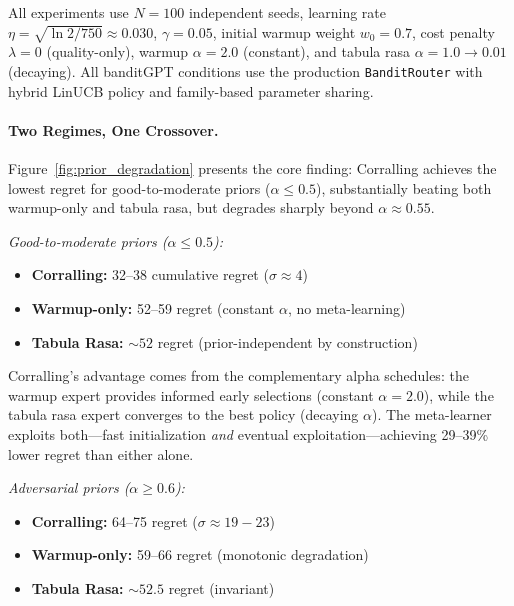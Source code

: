All experiments use $N{=}100$ independent seeds, learning rate
$\eta{=}\sqrt{\ln 2/750}{\approx}0.030$, $\gamma{=}0.05$, initial
warmup weight $w_0{=}0.7$, cost penalty $\lambda{=}0$ (quality-only),
warmup $\alpha{=}2.0$ (constant), and tabula rasa
$\alpha{=}1.0 \to 0.01$ (decaying).  All banditGPT conditions use the
production \texttt{BanditRouter} with hybrid LinUCB policy and
family-based parameter sharing.

\paragraph{Two Regimes, One Crossover.}
Figure~\ref{fig:prior_degradation} presents the core finding:
Corralling achieves the lowest regret for good-to-moderate priors
($\alpha \leq 0.5$), substantially beating both warmup-only and
tabula rasa, but degrades sharply beyond $\alpha{\approx}0.55$.

\emph{Good-to-moderate priors ($\alpha \leq 0.5$):}
\begin{itemize}[nosep]
    \item \textbf{Corralling:} 32--38 cumulative regret ($\sigma{\approx}4$)
    \item \textbf{Warmup-only:} 52--59 regret (constant $\alpha$,
          no meta-learning)
    \item \textbf{Tabula Rasa:} ${\sim}52$ regret (prior-independent
          by construction)
\end{itemize}

Corralling's advantage comes from the complementary alpha schedules:
the warmup expert provides informed early selections (constant
$\alpha{=}2.0$), while the tabula rasa expert converges to the best
policy (decaying $\alpha$).  The meta-learner exploits both---fast
initialization \emph{and} eventual exploitation---achieving 29--39\%
lower regret than either alone.

\emph{Adversarial priors ($\alpha \geq 0.6$):}
\begin{itemize}[nosep]
    \item \textbf{Corralling:} 64--75 regret ($\sigma{\approx}19{-}23$)
    \item \textbf{Warmup-only:} 59--66 regret (monotonic degradation)
    \item \textbf{Tabula Rasa:} ${\sim}52.5$ regret (invariant)
\end{itemize}

